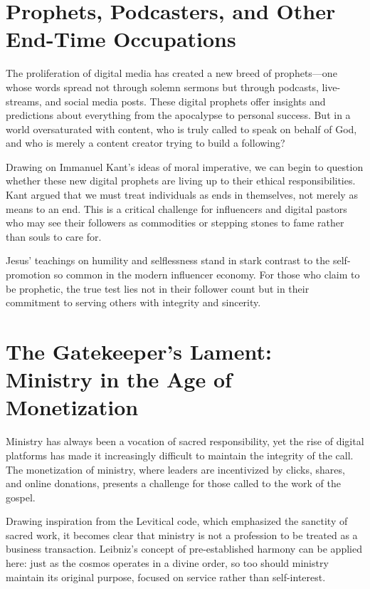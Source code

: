 \documentclass[a4paper,11pt]{book}
\begin{document}
\section{Prophets, Podcasters, and Other End-Time Occupations}

The proliferation of digital media has created a new breed of prophets—one whose words spread not through solemn sermons but through podcasts, live-streams, and social media posts. These digital prophets offer insights and predictions about everything from the apocalypse to personal success. But in a world oversaturated with content, who is truly called to speak on behalf of God, and who is merely a content creator trying to build a following?

Drawing on Immanuel Kant’s ideas of moral imperative, we can begin to question whether these new digital prophets are living up to their ethical responsibilities. Kant argued that we must treat individuals as ends in themselves, not merely as means to an end. This is a critical challenge for influencers and digital pastors who may see their followers as commodities or stepping stones to fame rather than souls to care for.

Jesus’ teachings on humility and selflessness stand in stark contrast to the self-promotion so common in the modern influencer economy. For those who claim to be prophetic, the true test lies not in their follower count but in their commitment to serving others with integrity and sincerity.

\section{The Gatekeeper’s Lament: Ministry in the Age of Monetization}

Ministry has always been a vocation of sacred responsibility, yet the rise of digital platforms has made it increasingly difficult to maintain the integrity of the call. The monetization of ministry, where leaders are incentivized by clicks, shares, and online donations, presents a challenge for those called to the work of the gospel. 

Drawing inspiration from the Levitical code, which emphasized the sanctity of sacred work, it becomes clear that ministry is not a profession to be treated as a business transaction. Leibniz’s concept of pre-established harmony can be applied here: just as the cosmos operates in a divine order, so too should ministry maintain its original purpose, focused on service rather than self-interest.
\end{document}
